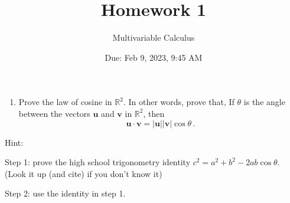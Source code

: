 \documentclass[12pt]{article}
\title{Homework 1}
\author{ Multivariable Calculus}
\date{Due: Feb 9, 2023, 9:45 AM}
\begin{document}
\maketitle

\begin{enumerate}
    \item Prove the law of cosine in $\mathbb{R}^2$. In other words,
        prove that, 
        If $\theta$ is the angle between the vectors $\textbf{u}$ and $\textbf{v}$ in $\mathbb{R}^2$, then
   \begin{equation*}
        \textbf{u}\cdot \textbf{v} = |\textbf{u}|| \textbf{v}| \cos \theta \,.
   \end{equation*}
\end{enumerate}
 Hint: 

 Step 1: prove the high school trigonometry identity $c^2 = a^2 + b^2 - 2ab\cos\theta$. (Look it up (and cite) if you don't know it)

 Step 2: use the identity in step 1.



%
\end{document}
